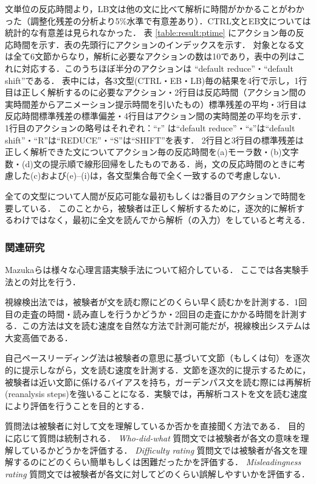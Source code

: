 \documentclass[japanese]{jnlp_1.4}
\def\modified#1{}
\begin{document}
文単位の反応時間より，LB文は他の文に比べて解析に時間がかかることがわかった（調整化残差の分析より5\%水準で有意差あり）．CTRL文とEB文については統計的な有意差は見られなかった．
表 \ref{table:result:ptime} にアクション毎の反応時間を示す．表の先頭行にアクションのインデックスを示す．
対象となる文は全て6文節からなり，解析に必要なアクションの数は10であり，表中の列はこれに対応する．このうちほぼ半分のアクションは ``default reduce''・``default shift''である．
表中には，各3文型(CTRL・EB・LB)毎の結果を4行で示し，1行目は正しく解析するのに必要なアクション・2行目は反応時間（アクション間の実時間差からアニメーション提示時間を引いたもの）標準残差の平均・3行目は反応時間標準残差の標準偏差・4行目はアクション間の実時間差の平均を示す．
1行目のアクションの略号はそれぞれ：``r'' は``default reduce''・``s''は``default shift''・``R''は``REDUCE''・``S''は``SHIFT''を表す．
2行目と3行目の標準残差は正しく解析できた文についてアクション毎の反応時間を(a)モーラ数・(b)文字数・(d)文の提示順で線形回帰をしたものである．尚，文の反応時間のときに考慮した(c)および(e)--(i)は，各文型集合毎で全く一致するので考慮しない．

全ての文型について人間が反応可能な最初もしくは2番目のアクションで時間を要している．
このことから，被験者は正しく解析するために，逐次的に解析するわけではなく，最初に全文を読んでから解析（の入力）をしていると考える．



\subsubsection{関連研究}


Mazukaらは様々な心理言語実験手法について紹介している\cite{Mazuka1997a}．
ここでは各実験手法との対比を行う．

視線検出法では，被験者が文を読む際にどのくらい早く読むかを計測する．1回目の走査の時間・読み直しを行うかどうか・2回目の走査にかかる時間を計測する．この方法は文を読む速度を自然な方法で計測可能だが，視線検出システムは大変高価である．

自己ペースリーディング法は被験者の意思に基づいて文節（もしくは句）を逐次的に提示しながら，文を読む速度を計測する．文節を逐次的に提示するために，被験者は近い文節に係けるバイアスを持ち，ガーデンパス文を読む際には再解析(reanalysis steps)を強いることになる．実験では，再解析コストを\modified{誤り率と}文を読む速度により評価を行うことを目的とする．

質問法は被験者に対して文を理解しているか否かを直接聞く方法である．
目的に応じて質問は統制される．
{\it Who-did-what} 質問文では被験者が各文の意味を理解しているかどうかを評価する．
{\it Difficulty rating} 質問文では被験者が各文を理解するのにどのくらい簡単もしくは困難だったかを評価する．
{\it Misleadingness rating} 質問文では被験者が各文に対してどのくらい誤解しやすいかを評価する．
\end{document}
